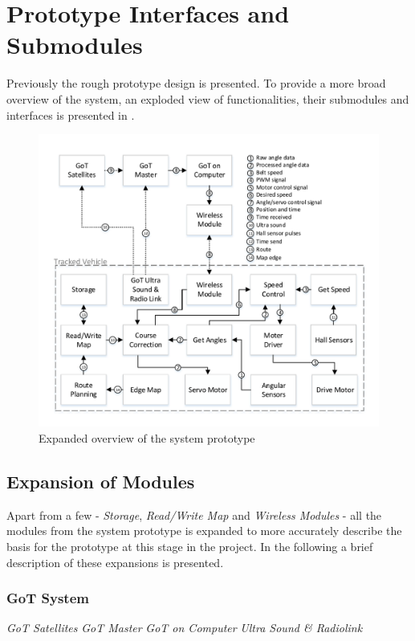 \section{Prototype Interfaces and Submodules}
Previously the rough prototype design is presented. To provide a more broad overview of the system, an exploded view of functionalities, their submodules and interfaces is presented in .

\begin{figure}[H]
	\centering
	\includegraphics[scale=.9]{figures/systemOverview2}
	\caption{Expanded overview of the system prototype}
	\label{fig:systemOverview2}
\end{figure}

\subsection{Expansion of Modules}
Apart from a few - \textit{Storage}, \textit{Read/Write Map} and \textit{Wireless Modules} - all the modules from the system prototype is expanded to more accurately describe the basis for the prototype at this stage in the project. In the following a brief description of these expansions is presented.

\subsubsection{GoT System}
\textit{GoT Satellites} \textit{GoT Master} \textit{GoT on Computer} \textit{Ultra Sound \& Radiolink}

